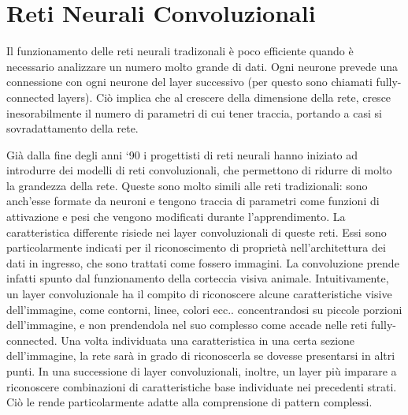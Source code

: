 \documentclass{article}
\begin{document}
\section{Reti Neurali Convoluzionali}
Il funzionamento delle reti neurali tradizonali è poco efficiente quando è necessario analizzare un numero molto grande di dati. Ogni neurone prevede una connessione con ogni neurone del layer successivo (per questo sono chiamati fully-connected layers). Ciò implica che al crescere della dimensione della rete, cresce inesorabilmente il numero di parametri di cui tener traccia, portando a casi si sovradattamento della rete.

Già dalla fine degli anni `90 i progettisti di reti neurali hanno iniziato ad introdurre dei modelli di reti convoluzionali, che permettono di ridurre di molto la grandezza della rete. Queste sono molto simili alle reti tradizionali: sono anch'esse formate da neuroni e tengono traccia di parametri come funzioni di attivazione e pesi che vengono modificati durante l'apprendimento. La caratteristica differente risiede nei layer convoluzionali di queste reti. Essi sono particolarmente indicati per il riconoscimento di proprietà nell'architettura dei dati in ingresso, che sono trattati come fossero immagini. La convoluzione prende infatti spunto dal funzionamento della corteccia visiva animale. Intuitivamente, un layer convoluzionale ha il compito di riconoscere alcune caratteristiche visive dell'immagine, come contorni, linee, colori ecc.. concentrandosi su piccole porzioni dell'immagine, e non prendendola nel suo complesso come accade nelle reti fully-connected. Una volta individuata una caratteristica in una certa sezione dell'immagine, la rete sarà in grado di riconoscerla se dovesse presentarsi in altri punti. In una successione di layer convoluzionali, inoltre, un layer più imparare a riconoscere combinazioni di caratteristiche base individuate nei precedenti strati. Ciò le rende particolarmente adatte alla comprensione di pattern complessi.
\end{document}

